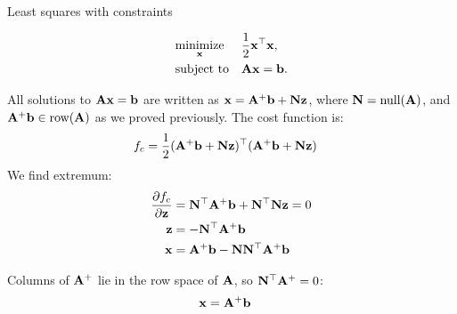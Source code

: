 \documentclass{beamer}
\begin{document}
\begin{frame}{Least squares with constraints}
	\begin{flushleft}
		
		\begin{small}
		\begin{equation}
			\begin{aligned}
				& \underset{\mathbf{x}}{\text{minimize}}
				& & \frac{1}{2} \mathbf{x}^\top \mathbf{x}, \\
				& \text{subject to}
				& & \mathbf{A} \mathbf{x} = \mathbf{b}.
			\end{aligned}
		\end{equation}
		
		All solutions to $\mathbf{A} \mathbf{x} = \mathbf{b}$ are written as $\mathbf{x} = \mathbf{A}^+\mathbf{b} + \mathbf{N}\mathbf{z}$, where $\mathbf{N} = \text{null}(\mathbf{A})$, and $\mathbf{A}^+\mathbf{b} \in \text{row}(\mathbf{A})$ as we proved previously.  The cost function is:
		\begin{align}
			f_c &= \frac{1}{2} (\mathbf{A}^+\mathbf{b} + \mathbf{N}\mathbf{z})^\top (\mathbf{A}^+\mathbf{b} + \mathbf{N}\mathbf{z}) 
		\end{align}
		We find extremum:
		\begin{align}
			\frac{\partial f_c}{\partial \mathbf{z}} &= \mathbf{N}^\top \mathbf{A}^+\mathbf{b} + \mathbf{N}^\top\mathbf{N}\mathbf{z} = 0
			\\
			\mathbf{z} &= - \mathbf{N}^\top \mathbf{A}^+\mathbf{b} 
			\\
			\mathbf{x} &= \mathbf{A}^+\mathbf{b} -  \mathbf{N}\mathbf{N}^\top \mathbf{A}^+\mathbf{b} 
		\end{align}
		
		Columns of $\mathbf{A}^+$ lie in the row space of $\mathbf{A}$, so $\mathbf{N}^\top \mathbf{A}^+ = 0$:
		\begin{align}
			\mathbf{x} &= \mathbf{A}^+\mathbf{b}
		\end{align}
	\end{small}
		
	\end{flushleft}
\end{frame}
\end{document}
